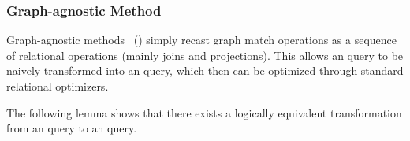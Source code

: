 
\subsubsection{Graph-agnostic Method}
\label{sec:intuitive-method}
Graph-agnostic methods~\cite{apache-age,DuckPGQ,DuckPGQ-VLDB} () simply recast graph match operations
as a sequence of relational operations (mainly joins and projections). This allows an \spjm query to be naively transformed into an \spj query, which then can be optimized through standard relational optimizers.

The following lemma shows that there exists a logically equivalent transformation from an \spjm query to an \spj query.

